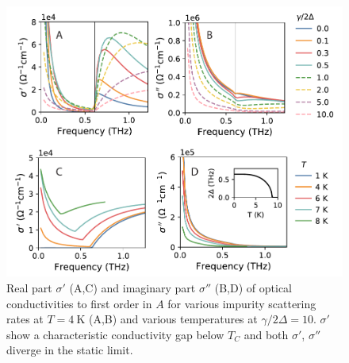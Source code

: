 \documentclass[aps,prb,reprint,noeprint,superscriptaddress]{revtex4-1}
\begin{document}
\begin{figure}[ht]
	\centering
	\includegraphics[width=\columnwidth]{figures/fig2.pdf}
	\caption{Real part $\sigma'$ (A,C) and imaginary part $\sigma''$ (B,D)
		of optical conductivities to first order in $A$ 
	for various impurity scattering rates at $T=\SI{4}{\kelvin}$ (A,B) and
various temperatures at $\gamma/2\Delta=10$. $\sigma'$ show a characteristic
conductivity gap below $T_C$ and both $\sigma'$, $\sigma''$ diverge in the
static limit.}
\end{figure}
\end{document}

